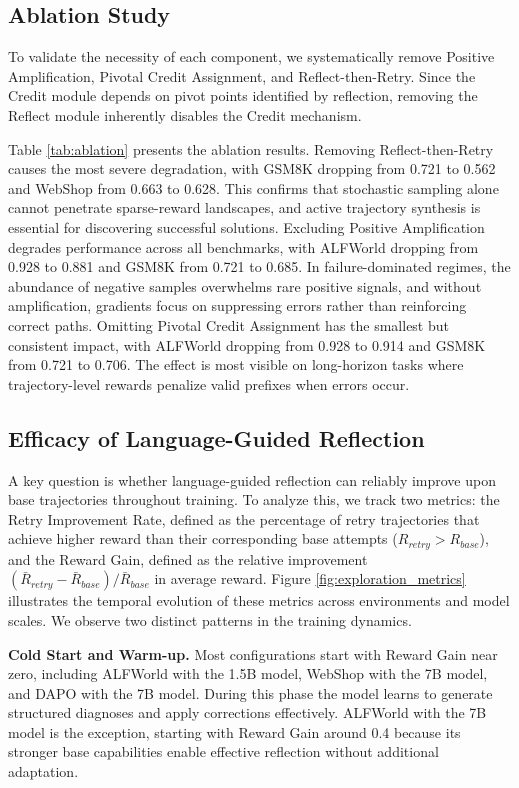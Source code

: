 \documentclass{article} %
\theoremstyle{definition}
\theoremstyle{remark}
\begin{document}
\subsection{Ablation Study} 
\vspace{-0.3em}
To validate the necessity of each component, we systematically remove Positive Amplification, Pivotal Credit Assignment, and Reflect-then-Retry. Since the Credit module depends on pivot points identified by reflection, removing the Reflect module inherently disables the Credit mechanism.

Table \ref{tab:ablation} presents the ablation results. Removing Reflect-then-Retry causes the most severe degradation, with GSM8K dropping from 0.721 to 0.562 and WebShop from 0.663 to 0.628. This confirms that stochastic sampling alone cannot penetrate sparse-reward landscapes, and active trajectory synthesis is essential for discovering successful solutions. Excluding Positive Amplification degrades performance across all benchmarks, with ALFWorld dropping from 0.928 to 0.881 and GSM8K from 0.721 to 0.685. In failure-dominated regimes, the abundance of negative samples overwhelms rare positive signals, and without amplification, gradients focus on suppressing errors rather than reinforcing correct paths. Omitting Pivotal Credit Assignment has the smallest but consistent impact, with ALFWorld dropping from 0.928 to 0.914 and GSM8K from 0.721 to 0.706. The effect is most visible on long-horizon tasks where trajectory-level rewards penalize valid prefixes when errors occur.

\subsection{Efficacy of Language-Guided Reflection}
\label{sec:reflect_efficacy}


A key question is whether language-guided reflection can reliably improve upon base trajectories throughout training. To analyze this, we track two metrics: the Retry Improvement Rate, defined as the percentage of retry trajectories that achieve higher reward than their corresponding base attempts ($R_{retry} > R_{base}$), and the Reward Gain, defined as the relative improvement $(\bar{R}_{retry} - \bar{R}_{base}) / \bar{R}_{base}$ in average reward. Figure \ref{fig:exploration_metrics} illustrates the temporal evolution of these metrics across environments and model scales. We observe two distinct patterns in the training dynamics.

\textbf{Cold Start and Warm-up.} Most configurations start with Reward Gain near zero, including ALFWorld with the 1.5B model, WebShop with the 7B model, and DAPO with the 7B model. During this phase the model learns to generate structured diagnoses and apply corrections effectively. ALFWorld with the 7B model is the exception, starting with Reward Gain around 0.4 because its stronger base capabilities enable effective reflection without additional adaptation.
\end{document}
